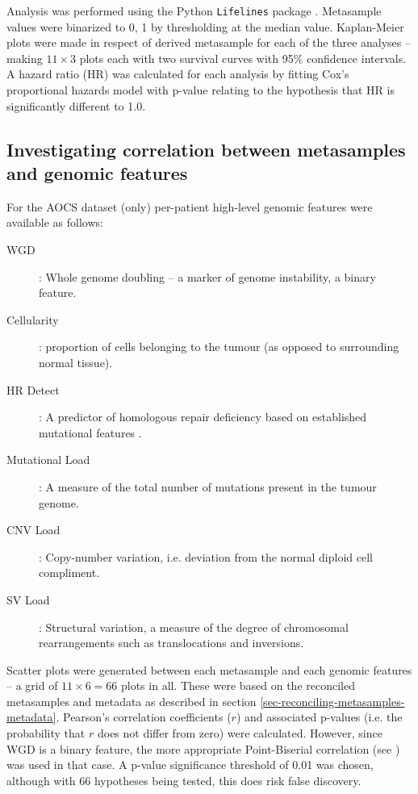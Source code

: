 \documentclass[tikz, 11pt,a4paper,oneside,fleqn]{article}
\begin{document}
Analysis was performed using the Python {\tt Lifelines} package \cite{Davidson-Pilon2020}.  
Metasample values were binarized to 0, 1 by thresholding at the median value.   Kaplan-Meier plots were made in respect of derived metasample for each of the three analyses -- making $11 \times 3$ plots each with two survival curves with 95\% confidence intervals.  A hazard ratio (HR)
was calculated for each analysis by fitting Cox's proportional hazards model with p-value relating to the hypothesis that HR is significantly different to 1.0.


\subsection{Investigating correlation between metasamples and genomic features}
\label{sec-genomic-features}

For the AOCS dataset (only) per-patient high-level genomic features were available as follows:
\begin{description}
\item[WGD]: Whole genome doubling -- a marker of genome instability, a binary feature.
\item[Cellularity]: proportion of cells belonging to the tumour (as opposed to surrounding normal tissue).
\item[HR Detect]: A predictor of homologous repair deficiency based on established mutational features \cite{Ewing2020}.
\item[Mutational Load]: A measure of the total number of mutations present in the tumour genome.
\item[CNV Load]: Copy-number variation, i.e. deviation from the normal diploid cell compliment.
\item[SV Load]: Structural variation, a measure of the degree of chromosomal rearrangements such as translocations and inversions.
\end{description}

Scatter plots were generated between each metasample and each genomic features -- a grid of $11 \times 6 = 66$ plots in all.  These were based on the reconciled metasamples and metadata as described in section \ref{sec-reconciling-metasamples-metadata}.  Pearson's correlation coefficients ($r$) and associated p-values (i.e. the probability that $r$ does not differ from zero) were calculated.   However, since WGD is a binary feature, the more appropriate Point-Biserial correlation (see \cite{Wikipediab}) was used in that case.  A p-value significance threshold of 0.01 was chosen, although with 66 hypotheses being tested, this does risk false discovery.
\end{document}
